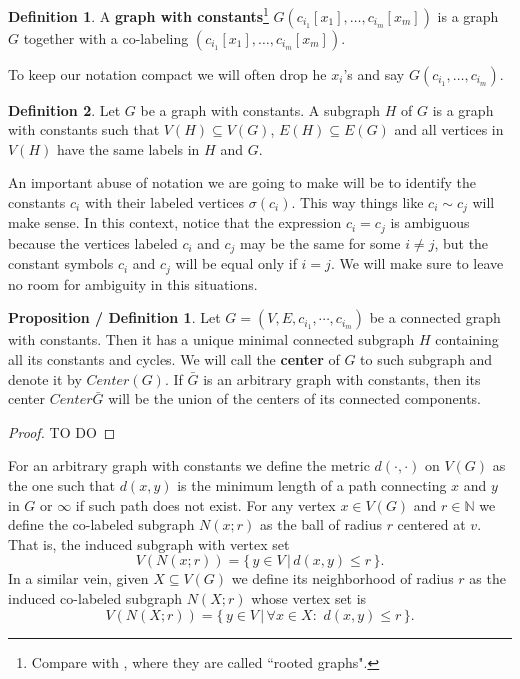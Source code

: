 \documentclass[11pt,notitlepage]{report}
\theoremstyle{definition}
\newtheorem{definition}{Definition}[chapter]
\newtheorem{propdef}{Proposition / Definition}[chapter]
\theoremstyle{remark}
\newcommand{\N}{\mathbb{N}}
\newcommand{\clist}{c_{i_1}, \cdots, c_{i_m}}
\begin{document}
\begin{definition} 
	A \textbf{graph with constants}\footnote{
		Compare with \cite{lynch1992probabilities}, where they are called ``rooted graphs". 
		}
	$G(c_{i_1}[x_1],\dots, c_{i_m}[x_m])$ 
	is a graph $G$ together with a co-labeling 
	$(c_{i_1}[x_1],\dots, c_{i_m}[x_m])$. 
\end{definition}

To keep our notation compact we will often drop 
he $x_i$'s and say $G(c_{i_1},\dots, c_{i_m})$. \par

\begin{definition}
Let $G$ be a graph with constants. A subgraph $H$ of $G$ is
a graph with constants such that $V(H)\subseteq V(G)$, $E(H)\subseteq E(G)$ and 
all vertices in $V(H)$ have the same labels in $H$ and $G$. 
\end{definition}


An important abuse of notation we are going to make
will be to identify the constants $c_i$ with their labeled
vertices $\sigma(c_i)$. This way things like $c_i\sim c_j$ 
will make sense. In this context, notice that the expression
$c_i=c_j$ is ambiguous because the vertices labeled $c_i$ and $c_j$ 
may be the same for some $i\neq j$, but 
the constant symbols $c_i$ and $c_j$ will be equal only if $i=j$. 
We will make sure to leave no room for ambiguity in this situations. \par


\begin{propdef}
	Let $G=(V,E,\clist)$ be a connected graph with constants. Then it has a unique minimal
	connected subgraph $H$ containing all its constants and cycles.
	We will call the \textbf{center} of $G$ to such subgraph and denote it by $Center(G)$.
	If $\bar{G}$ is an arbitrary graph with constants, then its center $Center{\bar{G}}$ will
	be the union of the centers of its connected components. 
\end{propdef}
\begin{proof}
	TO DO
\end{proof}

For an arbitrary graph with constants we define the metric $d(\cdot,\cdot)$ on $V(G)$ 
as the one such that $d(x,y)$ is the minimum length of a path connecting
$x$ and $y$ in $G$ or $\infty$ if such path does not exist. 
For any vertex $x\in V(G)$ and $r\in \N$ we define the co-labeled
subgraph $N(x;r)$ as the ball of radius $r$ centered at $v$. 
That is, the induced subgraph with vertex set
\[ V(N(x;r))= \{\, y\in V \, | \, d(x,y)\leq  r \,	\}.\] 
In a similar vein, given $X\subseteq V(G)$ we define its neighborhood of radius $r$ as
the induced co-labeled subgraph $N(X;r)$ whose vertex set is
\[ V(N(X;r))= \{\, y\in V \, | \, \forall x\in X: \, \,  d(x,y)\leq  r \,	\}.\]  
\par
\end{document}
